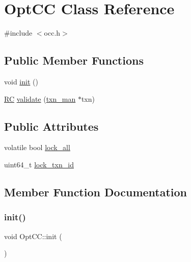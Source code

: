 \hypertarget{classOptCC}{}\section{Opt\+CC Class Reference}
\label{classOptCC}


{\ttfamily \#include $<$occ.\+h$>$}

\subsection*{Public Member Functions}
\begin{DoxyCompactItemize}
\item 
void \hyperlink{classOptCC_aa3ba49e935e9f1d0b83f9e815b71a09a}{init} ()
\item 
\hyperlink{global_8h_a78c49a674c810fdd03d20432f7be864a}{RC} \hyperlink{classOptCC_ad8b7a9a94e75565d5d7a0b5e01a2f9a4}{validate} (\hyperlink{classtxn__man}{txn\+\_\+man} $\ast$txn)
\end{DoxyCompactItemize}
\subsection*{Public Attributes}
\begin{DoxyCompactItemize}
\item 
volatile bool \hyperlink{classOptCC_a9c85846a4cd32e12561da6b0d056dc5b}{lock\+\_\+all}
\item 
uint64\+\_\+t \hyperlink{classOptCC_a3402f030762477a8467b2359d5444e82}{lock\+\_\+txn\+\_\+id}
\end{DoxyCompactItemize}


\subsection{Member Function Documentation}
\mbox{\label{classOptCC_aa3ba49e935e9f1d0b83f9e815b71a09a}} 
\subsubsection{\texorpdfstring{init()}{init()}}
{\footnotesize\ttfamily void Opt\+C\+C\+::init (\begin{DoxyParamCaption}{ }\end{DoxyParamCaption})}

\mbox{\label{classOptCC_ad8b7a9a94e75565d5d7a0b5e01a2f9a4}} 
